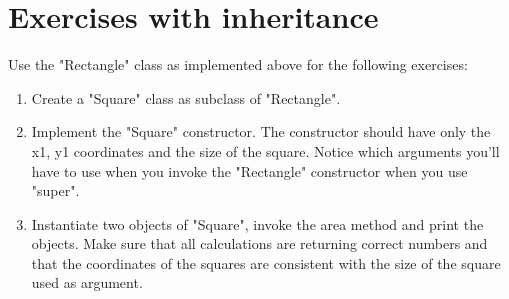 \section{Exercises with inheritance}

Use the "Rectangle" class as implemented above for the following exercises:

\begin{enumerate}

\item Create a "Square" class as subclass of "Rectangle".

\item Implement the "Square" constructor. The constructor should have only the x1, y1 coordinates and the size of the square. Notice which arguments you'll have to use when you invoke the "Rectangle" constructor when you use "super".

\item Instantiate two objects of "Square", invoke the area method and print the objects. Make sure that all calculations are returning correct numbers and that the coordinates of the squares are consistent with the size of the square used as argument.

\end{enumerate}
